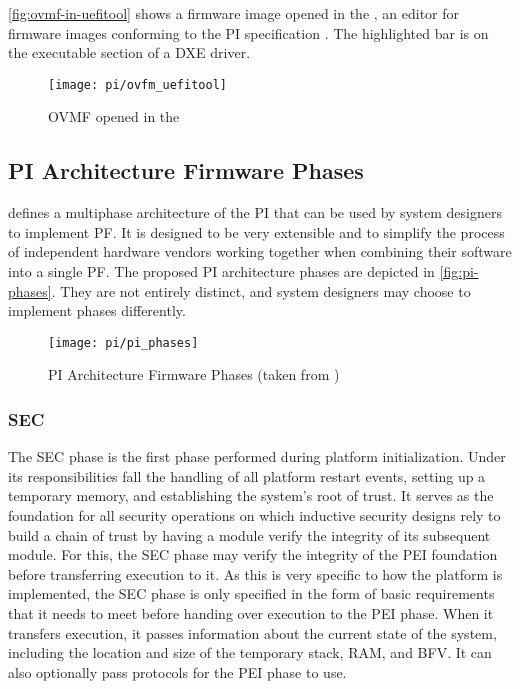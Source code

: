 \autoref{fig:ovmf-in-uefitool} shows a firmware image opened in the , an editor for firmware images conforming to the \ac{PI} specification \cite{uefitool}. The highlighted bar is on the executable section of a \acs{DXE} driver.

\begin{figure}[htb]%
    \centering%
    \texttt{[image: pi/ovfm\_uefitool]}%
    \caption[\acs{OVMF} opened in the ]{\acf{OVMF} opened in the }%
    \label{fig:ovmf-in-uefitool}%
\end{figure}


\subsection{\acs{PI} Architecture Firmware Phases}

\cite{pi-spec} defines a multiphase architecture of the \acl{PI} that can be used by system designers to implement \acl{PF}.
It is designed to be very extensible and to simplify the process of independent hardware vendors working together when combining their software into a single \ac{PF}.
The proposed \ac{PI} architecture phases are depicted in \autoref{fig:pi-phases}. They are not entirely distinct, and system designers may choose to implement phases differently.

\begin{figure}[htb]%
    \centering%
    \texttt{[image: pi/pi\_phases]}%
    \caption[\acs{PI} Architecture Firmware Phases]{\ac{PI} Architecture Firmware Phases (taken from \cite[Figure 2-1]{pi-spec})}%
    \label{fig:pi-phases}%
\end{figure}


\subsubsection{\acf{SEC}}

The \ac{SEC} phase is the first phase performed during platform initialization.
Under its responsibilities fall the handling of all platform restart events, setting up a temporary memory, and establishing the system's root of trust.
It serves as the foundation for all security operations on which inductive security designs rely to build a chain of trust by having a module verify the integrity of its subsequent module.
For this, the \ac{SEC} phase may verify the integrity of the \ac{PEI} foundation before transferring execution to it.
As this is very specific to how the platform is implemented, the \ac{SEC} phase is only specified in the form of basic requirements that it needs to meet before handing over execution to the \ac{PEI} phase.
When it transfers execution, it passes information about the current state of the system, including the location and size of the temporary stack, \ac{RAM}, and \ac{BFV}.
It can also optionally pass protocols for the \ac{PEI} phase to use.

